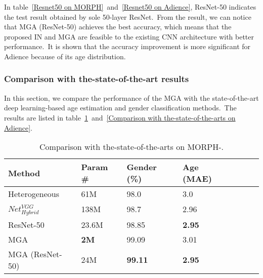 \documentclass[10pt,twocolumn,letterpaper]{article}
\begin{document}
In table~\ref{Resnet50 on MORPH}~and~\ref{Resnet50 on Adience}, ResNet-50 indicates the test result obtained by sole 50-layer ResNet.~From the result, we can notice that MGA (ResNet-50) achieves the best accuracy, which means that the proposed IN and MGA are feasible to the existing CNN architecture with better performance.~It is shown that the accuracy improvement is more significant for Adience because of its age distribution.

\subsubsection{Comparison with the-state-of-the-art results}
In this section, we compare the performance of the MGA with the state-of-the-art deep learning-based age estimation and gender classification methods.~The results are listed in table~\ref{Comparison with the-state-of-the-arts on MORPH}~and~\ref{Comparison with the-state-of-the-arts on Adience}.

\begin{table}[!h]
\centering
\caption{Comparison with the-state-of-the-arts on MORPH-.}
\label{Comparison with the-state-of-the-arts on MORPH}

\begin{adjustbox}{width=0.48\textwidth}
\begin{tabular}{p{3cm}llllll}

\hline
Method & Param \# & Gender (\%) & Age (MAE) \\ \hline
Heterogeneous~\cite{Han2018} & 61M & 98.0 & 3.0 \\
$Net_{Hybrid}^{VGG}$~\cite{Xing2017} & 138M & 98.7 & 2.96 \\
ResNet-50 & 23.6M & 98.85 & \textbf{2.95} \\
MGA & \textbf{2M} & 99.09 & 3.01 \\ 
MGA (ResNet-50) & 24M &  \textbf{99.11}  &  \textbf{2.95}\\\hline
 
\end{tabular}
\end{adjustbox}
\end{table}
\end{document}
